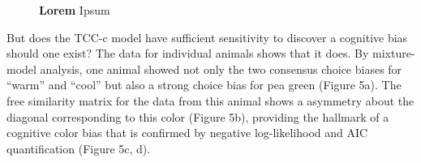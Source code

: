 \begin{figure}
    \centering
    \begin{subfigure}[b]{0.2\textwidth}
         \centering
         \caption{}
         
    \end{subfigure}
    \hfill
    \begin{subfigure}[b]{0.38\textwidth}
         \centering
         \caption{}
         
    \end{subfigure}
    \hfill
       \begin{subfigure}[b]{0.38\textwidth}
         \centering
         \caption{}
         
    \end{subfigure}
    \caption{\textbf{Lorem}
    Ipsum}
    \label{fig:IndiDataCogBias}
\end{figure}

But does the TCC-c model have sufficient sensitivity to discover a cognitive bias should one exist? The data for individual animals shows that it does. By mixture-model analysis, one animal showed not only the two consensus choice biases for “warm” and “cool” but also a strong choice bias for pea green (Figure 5a). The free similarity matrix for the data from this animal shows a asymmetry about the diagonal corresponding to this color (Figure 5b), providing the hallmark of a cognitive color bias that is confirmed by negative log-likelihood and AIC quantification (Figure 5c, d).


